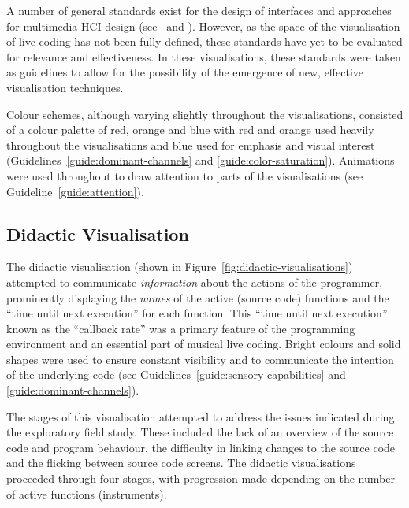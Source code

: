 A number of general standards exist for the design of interfaces and approaches for multimedia \ac{HCI} design (see~\cite{ISO2002} and \cite{Bevan2006}). However, as the space of the visualisation of live coding has not been fully defined, these standards have yet to be evaluated for relevance and effectiveness. In these visualisations, these standards were taken as guidelines to allow for the possibility of the emergence of new, effective visualisation techniques.

Colour schemes, although varying slightly throughout the visualisations, consisted of a colour palette of red, orange and blue with red and orange used heavily throughout the visualisations and blue used for emphasis and visual interest (Guidelines~\ref{guide:dominant-channels} and \ref{guide:color-saturation}). Animations were used throughout to draw attention to parts of the visualisations (see Guideline~\ref{guide:attention}).



\subsection{Didactic Visualisation}
\label{sec:didactic-visualisation}

The didactic visualisation (shown in Figure~\ref{fig:didactic-visualisations}) attempted to communicate \emph{information} about the actions of the programmer, prominently displaying the \emph{names} of the active (source code) functions and the ``time until next execution'' for each function. This ``time until next execution'' known as the ``callback rate'' was a primary feature of the programming environment and an essential part of musical live coding. Bright colours and solid shapes were used to ensure constant visibility and to communicate the intention of the underlying code (see Guidelines~\ref{guide:sensory-capabilities} and \ref{guide:dominant-channels}). 

The stages of this visualisation attempted to address the issues indicated during the exploratory field study. These included the lack of an overview of the source code and program behaviour, the difficulty in linking changes to the source code and the flicking between source code screens. The didactic visualisations proceeded through four stages, with progression made depending on the number of active functions (instruments).


